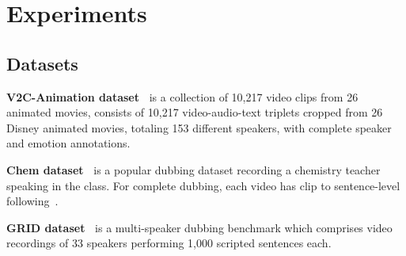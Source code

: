 \section{Experiments}




\subsection{Datasets}
\textbf{V2C-Animation dataset~\cite{V2C}} is a collection of 10,217 video clips from 26 animated movies,
consists of 10,217 video-audio-text triplets cropped from 26 Disney animated movies, totaling 153 different speakers, with complete speaker and emotion annotations.

\noindent\textbf{Chem dataset~\cite{chem_dataset}} is a popular dubbing dataset recording a chemistry teacher speaking in the class. 
For complete dubbing, each video has clip to sentence-level following~\cite{nerualdubber}. %

\noindent \textbf{GRID dataset~\cite{GRID}} is a multi-speaker dubbing benchmark which
comprises video recordings of 33 speakers performing 1,000 scripted sentences each.





